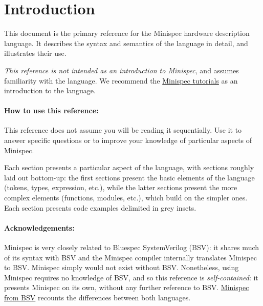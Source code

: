 \section{Introduction}
\label{sec:intro}

This document is the primary reference for the Minispec hardware description language.
It describes the syntax and semantics of the language in detail, and illustrates their use.

\emph{This reference is not intended as an introduction to Minispec}, and assumes familiarity with the language.
We recommend the \href{TODO}{Minispec tutorials} as an introduction to the language.

\paragraph{How to use this reference:}
This reference does not assume you will be reading it sequentially.
Use it to answer specific questions or to improve your knowledge of particular aspects of Minispec.

Each section presents a particular aspect of the language, with sections roughly laid out bottom-up:
the first sections present the basic elements of the language (tokens, types, expression, etc.),
while the latter sections present the more complex elements (functions, modules, etc.), which build on the simpler ones.
Each section presents code examples delimited in \colorbox{codebg}{grey insets}.


\paragraph{Acknowledgements:}
Minispec is very closely related to Bluespec SystemVerilog (BSV): it shares much of its syntax with BSV
and the Minispec compiler internally translates Minispec to BSV.
Minispec simply would not exist without BSV.
Nonetheless, using Minispec requires no knowledge of BSV, and so
this reference is \emph{self-contained}: it presents Minispec on its own, without any further reference to BSV.
\href{TODO}{Minispec from BSV} recounts the differences between both languages.

